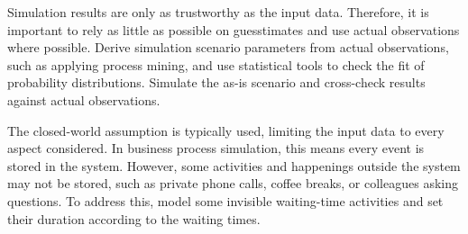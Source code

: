Simulation results are only as trustworthy as the input data. Therefore, it is important to rely as little as possible on guesstimates and use actual observations where possible. Derive simulation scenario parameters from actual observations, such as applying process mining, and use statistical tools to check the fit of probability distributions. Simulate the as-is scenario and cross-check results against actual observations.

The closed-world assumption is typically used, limiting the input data to every aspect considered. In business process simulation, this means every event is stored in the system. However, some activities and happenings outside the system may not be stored, such as private phone calls, coffee breaks, or colleagues asking questions. To address this, model some invisible waiting-time activities and set their duration according to the waiting times.
